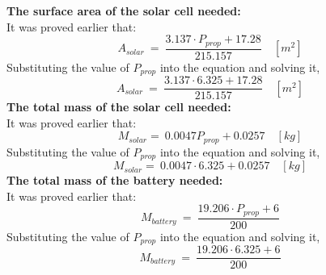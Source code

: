 \boxthree \vspace{1cm} \p \textbf{The surface area of the solar cell needed:} \vspace{0.1cm}\\ It was proved earlier that: \[ A_{solar} \ = \ \frac{ 3.137 \cdot P_{prop} + 17.28 }{ 215.157 } \quad [m^2] \] Substituting the value of $ P_{prop} $ into the equation and solving it, \[ A_{solar} \ = \ \frac{ 3.137 \cdot 6.325 + 17.28 }{ 215.157 } \quad [m^2] \] \boxfour \vspace{1cm} \p \textbf{The total mass of the solar cell needed:} \vspace{0.1cm}\\ It was proved earlier that: \[ M_{solar} = \ 0.0047 P_{prop} + 0.0257  \quad [kg] \] Substituting the value of $ P_{prop} $ into the equation and solving it, \[ M_{solar} = \ 0.0047 \cdot 6.325 + 0.0257  \quad [kg] \] \boxfive \vspace{1cm} \p \textbf{The total mass of the battery needed:} \vspace{0.1cm}\\ It was proved earlier that: \[ M_{battery} \ = \ \frac{ 19.206 \cdot P_{prop} + 6 }{ 200 } \] Substituting the value of $ P_{prop} $ into the equation and solving it, \[ M_{battery} \ = \ \frac{ 19.206 \cdot 6.325 + 6 }{ 200 } \] \boxsix
